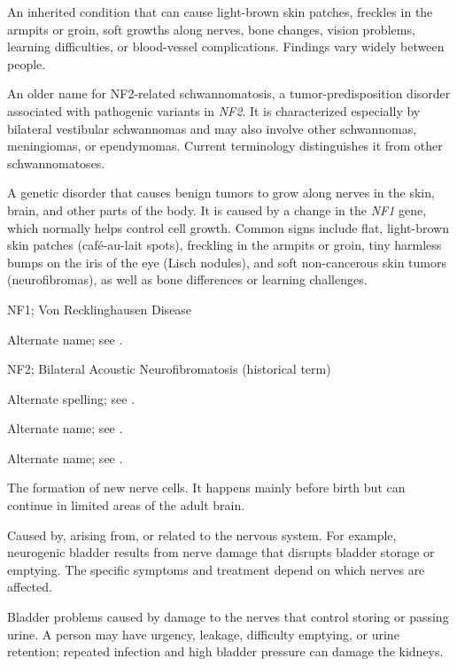  An inherited condition that can cause light-brown skin patches, freckles in the armpits or groin, soft growths along nerves, bone changes, vision problems, learning difficulties, or blood-vessel complications. Findings vary widely between people.

 An older name for NF2-related schwannomatosis, a tumor-predisposition disorder associated with pathogenic variants in \textit{NF2}. It is characterized especially by bilateral vestibular schwannomas and may also involve other schwannomas, meningiomas, or ependymomas. Current terminology distinguishes it from other schwannomatoses.

 A genetic disorder that causes benign tumors to grow along nerves in the skin, brain, and other parts of the body. It is caused by a change in the \textit{NF1} gene, which normally helps control cell growth. Common signs include flat, light-brown skin patches (café-au-lait spots), freckling in the armpits or groin, tiny harmless bumps on the iris of the eye (Lisch nodules), and soft non-cancerous skin tumors (neurofibromas), as well as bone differences or learning challenges.

\synonyms
NF1; Von Recklinghausen Disease

 Alternate name; see .

\synonyms
NF2; Bilateral Acoustic Neurofibromatosis (historical term)

 Alternate spelling; see .

 Alternate name; see .

 Alternate name; see .

 The formation of new nerve cells. It happens mainly before birth but can continue in limited areas of the adult brain.

 Caused by, arising from, or related to the nervous system. For example, neurogenic bladder results from nerve damage that disrupts bladder storage or emptying. The specific symptoms and treatment depend on which nerves are affected.

 Bladder problems caused by damage to the nerves that control storing or passing urine. A person may have urgency, leakage, difficulty emptying, or urine retention; repeated infection and high bladder pressure can damage the kidneys.

